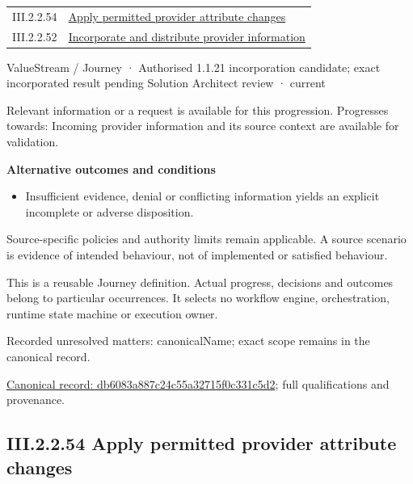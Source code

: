 \begin{longtable}{p{.22\linewidth}p{.73\linewidth}}
III.2.2.54 & \hyperref[element:1ceb340083984b9fbe393532c69abe72]{Apply permitted provider attribute changes} \\
III.2.2.52 & \hyperref[element:9eb9f3210d5e4b46ac21463f54e62ab9]{Incorporate and distribute provider information} \\
\end{longtable}
\label{element:db6083a887c24c55a32715f0c331c5d2}
{\small ValueStream / Journey · Authorised 1.1.21 incorporation candidate; exact incorporated result pending Solution Architect review · current}\par

Relevant information or a request is available for this progression. Progresses towards: Incoming provider information and its source context are available for validation.



\par\medskip\textbf{Alternative outcomes and conditions}\par


\begin{itemize}


\item Insufficient evidence, denial or conflicting information yields an explicit incomplete or adverse disposition.

\end{itemize}


Source-specific policies and authority limits remain applicable. A source scenario is evidence of intended behaviour, not of implemented or satisfied behaviour.



This is a reusable Journey definition. Actual progress, decisions and outcomes belong to particular occurrences. It selects no workflow engine, orchestration, runtime state machine or execution owner.


{\small Recorded unresolved matters: canonicalName; exact scope remains in the canonical record.}\par
{\footnotesize \href{../../../../../../../continuum/strategy/value-stream/db6083a887c24c55a32715f0c331c5d2.md}{Canonical record: db6083a887c24c55a32715f0c331c5d2}; full qualifications and provenance.}\par
\subsection*{III.2.2.54 Apply permitted provider attribute changes}
\label{navigation:III.2.2.54}

